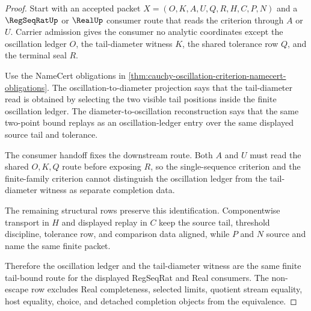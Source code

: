 \begin{proof}
Start with an accepted packet $X=(O,K,A,U,Q,R,H,C,P,N)$ and a $\RegSeqRatUp$ or $\RealUp$ consumer route that reads the criterion through $A$ or $U$. Carrier admission gives the consumer no analytic coordinates except the oscillation ledger $O$, the tail-diameter witness $K$, the shared tolerance row $Q$, and the terminal seal $R$.

Use the NameCert obligations in \autoref{thm:cauchy-oscillation-criterion-namecert-obligations}. The oscillation-to-diameter projection says that the tail-diameter read is obtained by selecting the two visible tail positions inside the finite oscillation ledger. The diameter-to-oscillation reconstruction says that the same two-point bound replays as an oscillation-ledger entry over the same displayed source tail and tolerance.

The consumer handoff fixes the downstream route. Both $A$ and $U$ must read the shared $O,K,Q$ route before exposing $R$, so the single-sequence criterion and the finite-family criterion cannot distinguish the oscillation ledger from the tail-diameter witness as separate completion data.

The remaining structural rows preserve this identification. Componentwise transport in $H$ and displayed replay in $C$ keep the source tail, threshold discipline, tolerance row, and comparison data aligned, while $P$ and $N$ source and name the same finite packet.

Therefore the oscillation ledger and the tail-diameter witness are the same finite tail-bound route for the displayed RegSeqRat and Real consumers. The non-escape row excludes Real completeness, selected limits, quotient stream equality, host equality, choice, and detached completion objects from the equivalence.
\end{proof}


\begin{closurestatus}{\CauchyOscillationCriterionUp}
  \theoryclosure{\seedClosure}
  \formalstatus{\unformalizedV}
\end{closurestatus}
